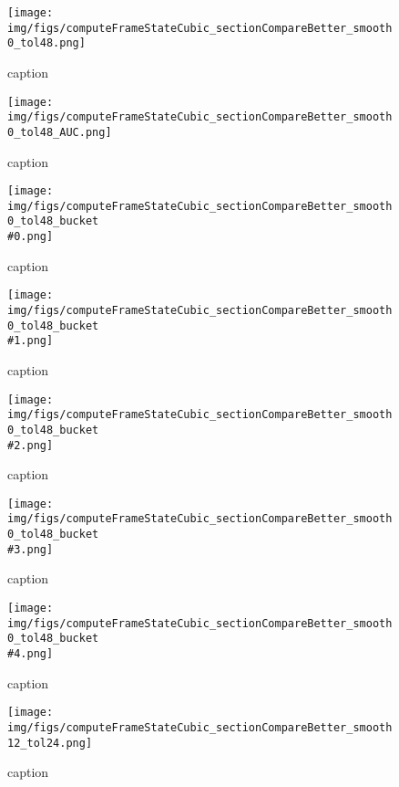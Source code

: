%
\begin{figure}[!ht]
	\centering
	\texttt{[image: img/figs/computeFrameStateCubic\_sectionCompareBetter\_smooth0\_tol48.png]}
	\caption{caption}
	\label{fig:computeFrameStateCubic_sectionCompareBetter_smooth0_tol48.png}
\end{figure}
%
\begin{figure}[!ht]
	\centering
	\texttt{[image: img/figs/computeFrameStateCubic\_sectionCompareBetter\_smooth0\_tol48\_AUC.png]}
	\caption{caption}
	\label{fig:computeFrameStateCubic_sectionCompareBetter_smooth0_tol48_AUC.png}
\end{figure}
%
\begin{figure}[!ht]
	\centering
	\texttt{[image: img/figs/computeFrameStateCubic\_sectionCompareBetter\_smooth0\_tol48\_bucket\\\#0.png]}
	\caption{caption}
	\label{fig:computeFrameStateCubic_sectionCompareBetter_smooth0_tol48_bucket\#0.png}
\end{figure}
%
\begin{figure}[!ht]
	\centering
	\texttt{[image: img/figs/computeFrameStateCubic\_sectionCompareBetter\_smooth0\_tol48\_bucket\\\#1.png]}
	\caption{caption}
	\label{fig:computeFrameStateCubic_sectionCompareBetter_smooth0_tol48_bucket\#1.png}
\end{figure}
%
\begin{figure}[!ht]
	\centering
	\texttt{[image: img/figs/computeFrameStateCubic\_sectionCompareBetter\_smooth0\_tol48\_bucket\\\#2.png]}
	\caption{caption}
	\label{fig:computeFrameStateCubic_sectionCompareBetter_smooth0_tol48_bucket\#2.png}
\end{figure}
%
\begin{figure}[!ht]
	\centering
	\texttt{[image: img/figs/computeFrameStateCubic\_sectionCompareBetter\_smooth0\_tol48\_bucket\\\#3.png]}
	\caption{caption}
	\label{fig:computeFrameStateCubic_sectionCompareBetter_smooth0_tol48_bucket\#3.png}
\end{figure}
%
\begin{figure}[!ht]
	\centering
	\texttt{[image: img/figs/computeFrameStateCubic\_sectionCompareBetter\_smooth0\_tol48\_bucket\\\#4.png]}
	\caption{caption}
	\label{fig:computeFrameStateCubic_sectionCompareBetter_smooth0_tol48_bucket\#4.png}
\end{figure}
%
\begin{figure}[!ht]
	\centering
	\texttt{[image: img/figs/computeFrameStateCubic\_sectionCompareBetter\_smooth12\_tol24.png]}
	\caption{caption}
	\label{fig:computeFrameStateCubic_sectionCompareBetter_smooth12_tol24.png}
\end{figure}
